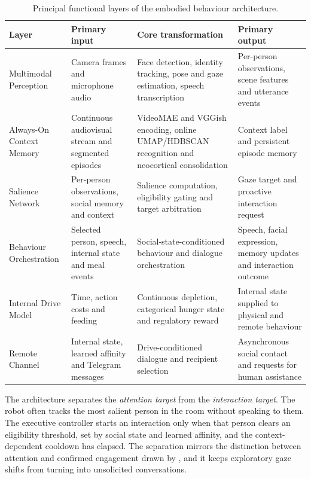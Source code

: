 \begin{table}[tbp]
    \centering
    \small
    \caption{Principal functional layers of the embodied behaviour architecture.}
    \label{tab:functional-layers}
    \begin{tabular}{@{}>{\raggedright\arraybackslash}p{}>{\raggedright\arraybackslash}p{}>{\raggedright\arraybackslash}p{}>{\raggedright\arraybackslash}p{}@{}}
        \toprule
\textbf{Layer} & \textbf{Primary input} & \textbf{Core transformation} & \textbf{Primary output} \\
\midrule
Multimodal Perception & Camera frames and microphone audio & Face detection, identity tracking, pose and gaze estimation, speech transcription & Per-person observations, scene features and utterance events \\
Always-On Context Memory & Continuous audiovisual stream and segmented episodes & VideoMAE and VGGish encoding, online UMAP/HDBSCAN recognition and neocortical consolidation & Context label and persistent episode memory \\
Salience Network & Per-person observations, social memory and context & Salience computation, eligibility gating and target arbitration & Gaze target and proactive interaction request \\
Behaviour Orchestration & Selected person, speech, internal state and meal events & Social-state-conditioned behaviour and dialogue orchestration & Speech, facial expression, memory updates and interaction outcome \\
Internal Drive Model & Time, action costs and feeding & Continuous depletion, categorical hunger state and regulatory reward & Internal state supplied to physical and remote behaviour \\
Remote Channel & Internal state, learned affinity and Telegram messages & Drive-conditioned dialogue and recipient selection & Asynchronous social contact and requests for human assistance \\
        \bottomrule
    \end{tabular}
\end{table}

The architecture separates the \emph{attention target} from the \emph{interaction target}. The robot often tracks the most salient person in the room without speaking to them. The executive controller starts an interaction only when that person clears an eligibility threshold, set by social state and learned affinity, and the context-dependent cooldown has elapsed. The separation mirrors the distinction between attention and confirmed engagement drawn by \citet{AbadMoya2026Initiation}, and it keeps exploratory gaze shifts from turning into unsolicited conversations.


